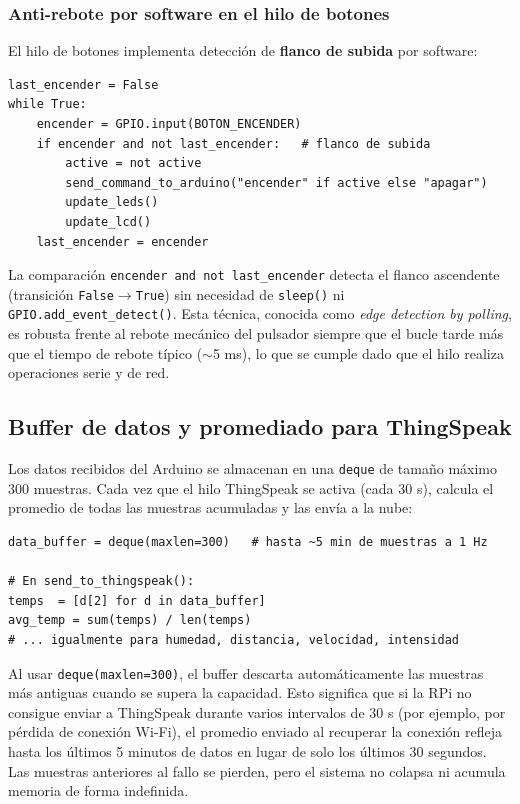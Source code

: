 \documentclass[12pt, a4paper]{article}
\begin{document}
\subsubsection{Anti-rebote por software en el hilo de botones}

El hilo de botones implementa detección de \textbf{flanco de subida} por software:

\begin{lstlisting}[style=python, caption={Detección de flanco en button\_thread}]
last_encender = False
while True:
    encender = GPIO.input(BOTON_ENCENDER)
    if encender and not last_encender:   # flanco de subida
        active = not active
        send_command_to_arduino("encender" if active else "apagar")
        update_leds()
        update_lcd()
    last_encender = encender
\end{lstlisting}

\begin{notatecnica}
La comparación \texttt{encender and not last\_encender} detecta el flanco ascendente
(transición \texttt{False}$\to$\texttt{True}) sin necesidad de \texttt{sleep()} ni
\texttt{GPIO.add\_event\_detect()}. Esta técnica, conocida como
\textit{edge detection by polling}, es robusta frente al rebote mecánico del
pulsador siempre que el bucle tarde más que el tiempo de rebote típico ($\sim$5 ms),
lo que se cumple dado que el hilo realiza operaciones serie y de red.
\end{notatecnica}

\subsection{Buffer de datos y promediado para ThingSpeak}

Los datos recibidos del Arduino se almacenan en una \texttt{deque} de tamaño máximo
300 muestras. Cada vez que el hilo ThingSpeak se activa (cada 30 s), calcula el
promedio de todas las muestras acumuladas y las envía a la nube:

\begin{lstlisting}[style=python, caption={Cálculo de promedios en send\_to\_thingspeak()}]
data_buffer = deque(maxlen=300)   # hasta ~5 min de muestras a 1 Hz

# En send_to_thingspeak():
temps  = [d[2] for d in data_buffer]
avg_temp = sum(temps) / len(temps)
# ... igualmente para humedad, distancia, velocidad, intensidad
\end{lstlisting}

\begin{notatecnica}
Al usar \texttt{deque(maxlen=300)}, el buffer descarta automáticamente las muestras
más antiguas cuando se supera la capacidad. Esto significa que si la RPi no consigue
enviar a ThingSpeak durante varios intervalos de 30 s (por ejemplo, por pérdida de
conexión Wi-Fi), el promedio enviado al recuperar la conexión refleja hasta los
últimos 5 minutos de datos en lugar de solo los últimos 30 segundos. Las muestras
anteriores al fallo se pierden, pero el sistema no colapsa ni acumula memoria de
forma indefinida.
\end{notatecnica}
\end{document}
